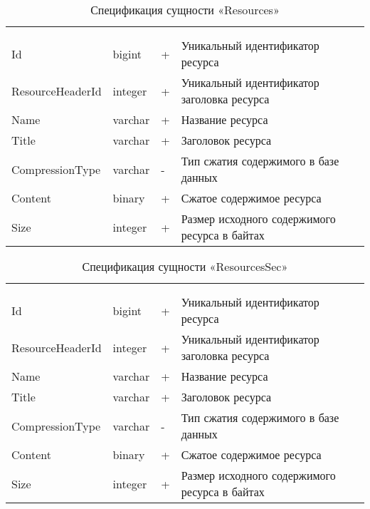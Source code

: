 \begin{xltabular}{\textwidth}{|X|X|X|X|}
	\caption{Спецификация сущности «Resources»}\label{indexer_resources:table}\\ \hline
	 &  &  &  \\ \hline
	 &  &  &  \\ \hline
	\endfirsthead
	 \hline
	 &  &  &  \\ \hline
	\endhead
	Id & bigint & + & Уникальный идентификатор ресурса \\ \hline
	ResourceHeaderId & integer & + & Уникальный идентификатор заголовка ресурса \\ \hline 
	Name & varchar & + & Название ресурса \\ \hline
	Title & varchar & + & Заголовок ресурса \\ \hline
	CompressionType & varchar & - & Тип сжатия содержимого в базе данных \\ \hline
	Content & binary & + & Сжатое содержимое ресурса \\ \hline
	Size & integer & + & Размер исходного содержимого ресурса в байтах \\ \hline
\end{xltabular}

\begin{xltabular}{\textwidth}{|X|X|X|X|}
	\caption{Спецификация сущности «ResourcesSec»}\label{indexer_resources_sec:table}\\ \hline
	 &  &  &  \\ \hline
	 &  &  &  \\ \hline
	\endfirsthead
	 \hline
	 &  &  &  \\ \hline
	\endhead
	Id & bigint & + & Уникальный идентификатор ресурса \\ \hline
	ResourceHeaderId & integer & + & Уникальный идентификатор заголовка ресурса \\ \hline 
	Name & varchar & + & Название ресурса \\ \hline
	Title & varchar & + & Заголовок ресурса \\ \hline
	CompressionType & varchar & - & Тип сжатия содержимого в базе данных \\ \hline
	Content & binary & + & Сжатое содержимое ресурса \\ \hline
	Size & integer & + & Размер исходного содержимого ресурса в байтах \\ \hline
\end{xltabular}

